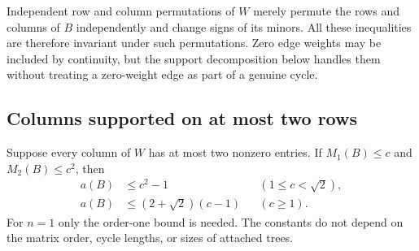 Independent row and column permutations of $W$ merely permute the
rows and columns of $B$ independently and change signs of its minors.
All these inequalities are therefore invariant under such
permutations.  Zero edge weights may be included by continuity, but
the support decomposition below handles them without treating a
zero-weight edge as part of a genuine cycle.

\subsection{Columns supported on at most two rows}

\begin{theorem}
\label{thm:inverse-support-two}
Suppose every column of $W$ has at most two nonzero entries.  If
$M_1(B)\leq c$ and $M_2(B)\leq c^2$, then
\begin{align}
 a(B)&\leq c^2-1 &&(1\leq c<\sqrt2),
 \label{eq:inverse-support-local}\\
 a(B)&\leq(2+\sqrt2)(c-1)&&(c\geq1).
 \label{eq:inverse-support-global}
\end{align}
For $n=1$ only the order-one bound is needed.  The constants do not
depend on the matrix order, cycle lengths, or sizes of attached trees.
\end{theorem}

